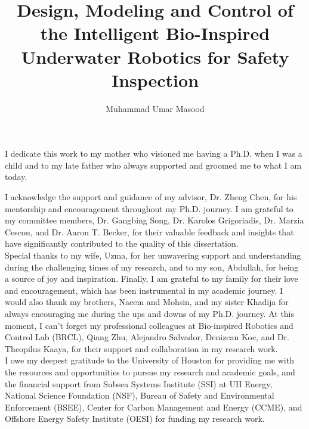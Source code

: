 \documentclass{uhcoethesis}
\title{Design, Modeling and Control of the Intelligent Bio-Inspired Underwater Robotics for Safety Inspection}
\author{Muhammad Umar Masood}
\begin{document}
\frontmatter
\maketitlepage
\makecopyrightpage

\begin{dedication}
I dedicate this work to my mother who visioned me having a Ph.D. when I was a child and to my late father who always supported and groomed me to what I am today.
\end{dedication}

\begin{acknowledgements}
I acknowledge the support and guidance of my advisor, Dr. Zheng Chen, for his mentorship and encouragement throughout my Ph.D. journey. I am grateful to my committee members, Dr. Gangbing Song, Dr. Karolos Grigoriadis, Dr. Marzia Cescon, and Dr. Aaron T. Becker, for their valuable feedback and insights that have significantly contributed to the quality of this dissertation.\\
Special thanks to my wife, Uzma, for her unwavering support and understanding during the challenging times of my research, and to my son, Abdullah, for being a source of joy and inspiration. Finally, I am grateful to my family for their love and encouragement, which has been instrumental in my academic journey. I would also thank my brothers, Naeem and Mohsin, and my sister Khadija for always encouraging me during the ups and downs of my Ph.D. journey. At this moment, I can't forget my professional colleagues at Bio-inspired Robotics and Control Lab (BRCL), Qiang Zhu, Alejandro Salvador, Denizcan Koc, and Dr. Theopilus Kaaya, for their support and collaboration in my research work.\\
I owe my deepest gratitude to the University of Houston for providing me with the resources and opportunities to pursue my research and academic goals, and the financial support from Subsea Systems Institute (SSI) at UH Energy, National Science Foundation (NSF), Bureau of Safety and Environmental Enforcement (BSEE), Center for Carbon Management and Energy (CCME), and Offshore Energy Safety Institute (OESI) for funding my research work.
\end{acknowledgements}
\end{document}
